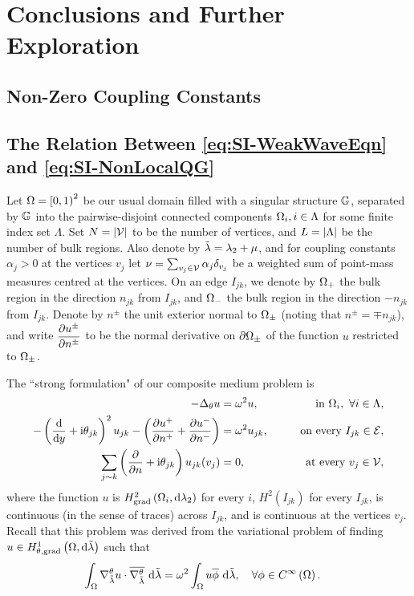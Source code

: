 \section{Conclusions and Further Exploration} \label{sec:SI-Conc}

\subsection{Non-Zero Coupling Constants} \label{ssec:SI-NonZeroAlpha}

\subsection{The Relation Between \eqref{eq:SI-WeakWaveEqn} and \eqref{eq:SI-NonLocalQG}} \label{ssec:SI-Strauss}

Let $\Omega=\left[0,1\right)^2$ be our usual domain filled with a singular structure $\mathbb{G}$, separated by $\mathbb{G}$ into the pairwise-disjoint connected components $\Omega_i, i\in\Lambda$ for some finite index set $\Lambda$.
Set $N = \left\lvert \mathcal{V} \right\rvert$ to be the number of vertices, and $L=\left\lvert \Lambda \right\rvert$ be the number of bulk regions.
Also denote by $\tilde{\lambda} = \lambda_2 + \mu$, and for coupling constants $\alpha_j>0$ at the vertices $v_j$ let $\nu = \sum_{v_j\in\mathcal{V}}\alpha_j\delta_{v_j}$ be a weighted sum of point-mass measures centred at the vertices.
On an edge $I_{jk}$, we denote by $\Omega_+$ the bulk region in the direction $n_{jk}$ from $I_{jk}$, and $\Omega_-$ the bulk region in the direction $-n_{jk}$ from $I_{jk}$.
Denote by $n^{\pm}$ the unit exterior normal to $\Omega_{\pm}$ (noting that $n^{\pm}=\mp n_{jk}$), and write $\dfrac{\partial u^{\pm}}{\partial n^{\pm}}$ to be the normal derivative on $\partial\Omega_{\pm}$ of the function $u$ restricted to $\Omega_{\pm}$.

The ``strong formulation" of our composite medium problem is
\begin{subequations} \label{eq:StrongForm}
	\begin{align}
		-\Delta_{\theta}u &= \omega^2 u, &\qquad\text{in } \Omega_i, \ \forall i\in\Lambda, \\
		-\left( \dfrac{\mathrm{d}}{\mathrm{d}y}+\mathrm{i}\theta_{jk} \right)^2 u_{jk} - \left( \dfrac{\partial u^+}{\partial n^+} + \dfrac{\partial u^-}{\partial n^-} \right) &= \omega^2 u_{jk},  &\qquad\text{on every } I_{jk}\in\mathcal{E}, \\
		\sum_{j\sim k}\left( \dfrac{\partial }{\partial n}+\mathrm{i}\theta_{jk} \right)u_{jk}(v_j) &= 0, &\qquad\text{at every } v_j\in\mathcal{V},
	\end{align}
\end{subequations}
where the function $u$ is $H^2_\mathrm{grad}\left( \Omega_i, \mathrm{d}\lambda_2 \right)$ for every $i$, $H^2(I_{jk})$ for every $I_{jk}$, is continuous (in the sense of traces) across $I_{jk}$, and is continuous at the vertices $v_j$.
Recall that this problem was derived from the variational problem of finding $u\in H^1_{\theta, \mathrm{grad}}\left( \Omega, \mathrm{d}\tilde{\lambda} \right)$ such that
\begin{align} \label{eq:WeakForm}
	\int_{\Omega} \nabla^{\theta}_{\tilde{\lambda}}u\cdot\overline{\nabla^{\theta}_{\tilde{\lambda}}}  \ \mathrm{d}\tilde{\lambda} &=
	\omega^2\int_{\Omega} u\overline{\phi}  \ \mathrm{d}\tilde{\lambda}, \quad\forall\phi\in C^{\infty}\left( \Omega \right).
\end{align}


